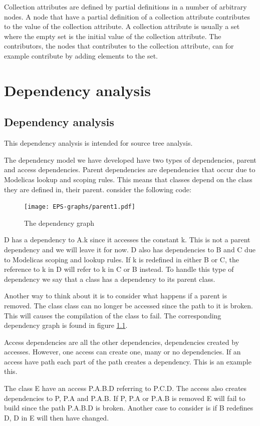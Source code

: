 \documentclass{cslthse-msc}
\begin{document}
Collection attributes are defined by partial definitions in a number of arbitrary nodes. A node that have a partial definition of a collection attribute contributes to the value of the collection attribute. A collection attribute is usually a set where the empty set is the initial value of the collection attribute. The contributors, the nodes that contributes to the collection attribute, can for example contribute by adding elements to the set.~\cite{magnusson2007extending}

\chapter[Dependency analysis]{Dependency analysis}

\section{Dependency analysis}

This dependency analysis is intended for source tree analysis.

The dependency model we have developed have two types of dependencies, parent and access dependencies. Parent dependencies are dependencies that occur due to Modelicas lookup and scoping rules. This means that classes depend on the class they are defined in, their parent. consider the following code:


\begin{figure}
    \centering
    \texttt{[image: EPS-graphs/parent1.pdf]}
  \caption{The dependency graph}
  \label{fig:parent1graph}
\end{figure}

D has a dependency to A.k since it accesses the constant k. This is not a parent dependency and we will leave it for now. D also has dependencies to B and C due to Modelicas scoping and lookup rules. If k is redefined in either B or C, the reference to k in D will refer to k in C or B instead. To handle this type of dependency we say that a class has a dependency to its parent class.

Another way to think about it is to consider what happens if a parent is removed. The class class can no longer be accessed since the path to it is broken. This will causes the compilation of the class to fail. The corresponding dependency graph is found in figure \ref{fig:parent1graph}.

Access dependencies are all the other dependencies, dependencies created by accesses. However, one access can create one, many or no dependencies. If an access have path each part of the path creates a dependency. This is an example this.

The class E have an access P.A.B.D referring to P.C.D. The access also creates dependencies to P, P.A and P.A.B. If P, P.A or P.A.B is removed E will fail to build since the path P.A.B.D is broken. Another case to consider is if B redefines D, D in E will then have changed.
\end{document}
